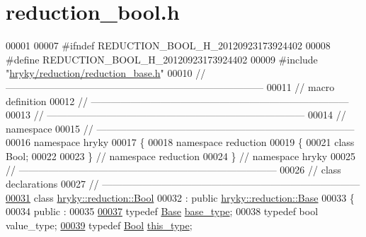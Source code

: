 \hypertarget{reduction__bool_8h_source}{\section{reduction\-\_\-bool.\-h}
}

\begin{DoxyCode}
00001 
00007 \textcolor{preprocessor}{#ifndef REDUCTION\_BOOL\_H\_20120923173924402}
00008 \textcolor{preprocessor}{}\textcolor{preprocessor}{#define REDUCTION\_BOOL\_H\_20120923173924402}
00009 \textcolor{preprocessor}{}\textcolor{preprocessor}{#include "\hyperlink{reduction__base_8h}{hryky/reduction/reduction_base.h}"}
00010 \textcolor{comment}{//
      ------------------------------------------------------------------------------}
00011 \textcolor{comment}{// macro definition}
00012 \textcolor{comment}{//
      ------------------------------------------------------------------------------}
00013 \textcolor{comment}{//
      ------------------------------------------------------------------------------}
00014 \textcolor{comment}{// namespace}
00015 \textcolor{comment}{//
      ------------------------------------------------------------------------------}
00016 \textcolor{keyword}{namespace }hryky
00017 \{
00018 \textcolor{keyword}{namespace }reduction
00019 \{
00021     \textcolor{keyword}{class }Bool;
00022 
00023 \} \textcolor{comment}{// namespace reduction}
00024 \} \textcolor{comment}{// namespace hryky}
00025 \textcolor{comment}{//
      ------------------------------------------------------------------------------}
00026 \textcolor{comment}{// class declarations}
00027 \textcolor{comment}{//
      ------------------------------------------------------------------------------}
\hypertarget{reduction__bool_8h_source_l00031}{}\hyperlink{classhryky_1_1reduction_1_1_bool}{00031} \textcolor{comment}{}\textcolor{keyword}{class }\hyperlink{classhryky_1_1reduction_1_1_bool}{hryky::reduction::Bool}
00032     : \textcolor{keyword}{public} \hyperlink{classhryky_1_1reduction_1_1_base}{hryky::reduction::Base}
00033 \{
00034 \textcolor{keyword}{public} :
00035 
\hypertarget{reduction__bool_8h_source_l00037}{}\hyperlink{classhryky_1_1reduction_1_1_bool_a883cbc4678bb225f4a5c0ea6b58d932e}{00037}     \textcolor{keyword}{typedef} \hyperlink{classhryky_1_1reduction_1_1_base}{Base}    \hyperlink{classhryky_1_1reduction_1_1_bool_a883cbc4678bb225f4a5c0ea6b58d932e}{base_type};
00038     \textcolor{keyword}{typedef} \textcolor{keywordtype}{bool}    value\_type;
\hypertarget{reduction__bool_8h_source_l00039}{}\hyperlink{classhryky_1_1reduction_1_1_bool_aae7090b0a5295d9d875e74702674eaf1}{00039}     \textcolor{keyword}{typedef} \hyperlink{classhryky_1_1reduction_1_1_bool}{Bool}    \hyperlink{classhryky_1_1reduction_1_1_bool_aae7090b0a5295d9d875e74702674eaf1}{this_type};

\end{DoxyCode}
